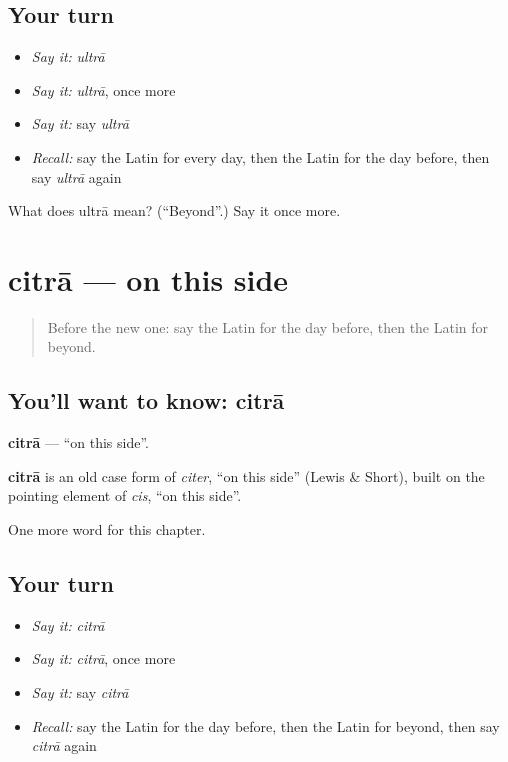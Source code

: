 \subsection*{Your turn}
\begin{itemize}
\raggedright
  \item \emph{Say it:} \emph{ultrā}
  \item \emph{Say it:} \emph{ultrā}, once more
  \item \emph{Say it:} say \emph{ultrā}
  \item \emph{Recall:} say the Latin for every day, then the Latin for the day before, then say \emph{ultrā} again
\end{itemize}

\begin{tcolorbox}[breakable,colback=teal!4,colframe=teal!35!black,title={Before you move on}]
What does ultrā mean? (\textquotedblleft{}Beyond\textquotedblright{}.) Say it once more.
\end{tcolorbox}
\section[citrā]{citrā — on this side}

\label{lesson:LA-C238-citra}



\begin{quote}
Before the new one: say the Latin for the day before, then the Latin for beyond.
\end{quote}

\subsection*{You'll want to know: citrā}
\textbf{citrā} — \textquotedblleft{}on this side\textquotedblright{}.

\begin{cousinweb}
\textbf{citrā} is an old case form of \emph{citer}, \textquotedblleft{}on this side\textquotedblright{} (Lewis \& Short), built on the pointing element of \emph{cis}, \textquotedblleft{}on this side\textquotedblright{}.
\end{cousinweb}

\begin{grammarlens}[title={What you've built}]
One more word for this chapter.
\end{grammarlens}

\subsection*{Your turn}
\begin{itemize}
\raggedright
  \item \emph{Say it:} \emph{citrā}
  \item \emph{Say it:} \emph{citrā}, once more
  \item \emph{Say it:} say \emph{citrā}
  \item \emph{Recall:} say the Latin for the day before, then the Latin for beyond, then say \emph{citrā} again
\end{itemize}

